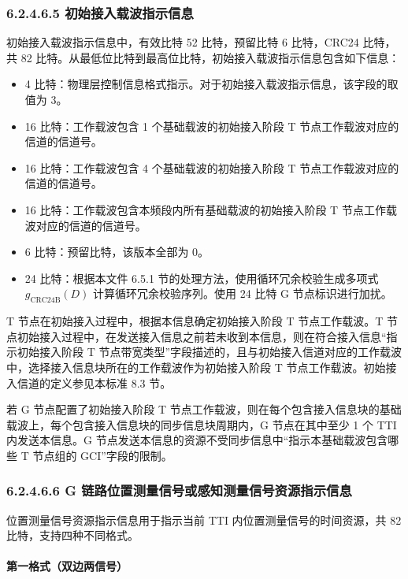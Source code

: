 \documentclass[11pt,a4paper]{ctexart}
\begin{document}
\subsubsection{6.2.4.6.5 初始接入载波指示信息}

初始接入载波指示信息中，有效比特 52 比特，预留比特 6 比特，CRC24 比特，共 82 比特。从最低位比特到最高位比特，初始接入载波指示信息包含如下信息：
\begin{itemize}[nosep]
  \item 4 比特：物理层控制信息格式指示。对于初始接入载波指示信息，该字段的取值为 3。
  \item 16 比特：工作载波包含 1 个基础载波的初始接入阶段 T 节点工作载波对应的信道的信道号。
  \item 16 比特：工作载波包含 4 个基础载波的初始接入阶段 T 节点工作载波对应的信道的信道号。
  \item 16 比特：工作载波包含本频段内所有基础载波的初始接入阶段 T 节点工作载波对应的信道的信道号。
  \item 6 比特：预留比特，该版本全部为 0。
  \item 24 比特：根据本文件 6.5.1 节的处理方法，使用循环冗余校验生成多项式 $g_{\mathrm{CRC24B}}(D)$ 计算循环冗余校验序列。使用 24 比特 G 节点标识进行加扰。
\end{itemize}

T 节点在初始接入过程中，根据本信息确定初始接入阶段 T 节点工作载波。T 节点初始接入过程中，在发送接入信息之前若未收到本信息，则在符合接入信息``指示初始接入阶段 T 节点带宽类型''字段描述的，且与初始接入信道对应的工作载波中，选择接入信息块所在的工作载波作为初始接入阶段 T 节点工作载波。初始接入信道的定义参见本标准 8.3 节。

若 G 节点配置了初始接入阶段 T 节点工作载波，则在每个包含接入信息块的基础载波上，每个包含接入信息块的同步信息块周期内，G 节点在其中至少 1 个 TTI 内发送本信息。G 节点发送本信息的资源不受同步信息中``指示本基础载波包含哪些 T 节点组的 GCI''字段的限制。

\subsubsection{6.2.4.6.6 G 链路位置测量信号或感知测量信号资源指示信息}

位置测量信号资源指示信息用于指示当前 TTI 内位置测量信号的时间资源，共 82 比特，支持四种不同格式。

\paragraph{第一格式（双边两信号）}
\end{document}
